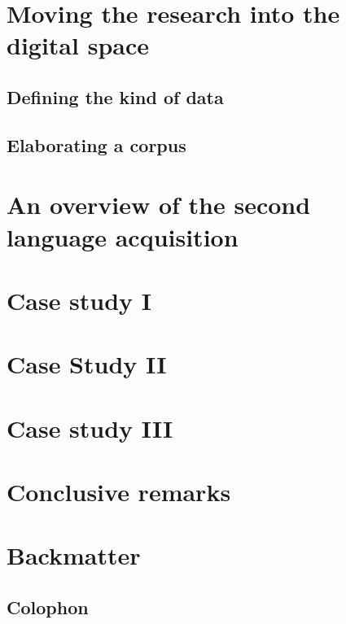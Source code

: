 \documentclass[a4paper,twoside,12pt,chapterprefix=false,bibliography=totocnumbered,listof=flat]{scrbook}
\begin{document}
\chapter{Moving the research into the digital
space}\label{moving-the-research-into-the-digital-space}

\section{Defining the kind of data}\label{defining-the-kind-of-data}

\section{Elaborating a corpus}\label{elaborating-a-corpus}

\chapter{An overview of the second language
acquisition}\label{an-overview-of-the-second-language-acquisition}

\chapter{Case study I}\label{case-study-i}

\chapter{Case Study II}\label{case-study-ii}

\chapter{Case study III}\label{case-study-iii}

\chapter{Conclusive remarks}\label{conclusive-remarks}

\backmatter

\chapter{Backmatter}\label{backmatter}

\section{Colophon}\label{colophon}
\end{document}
